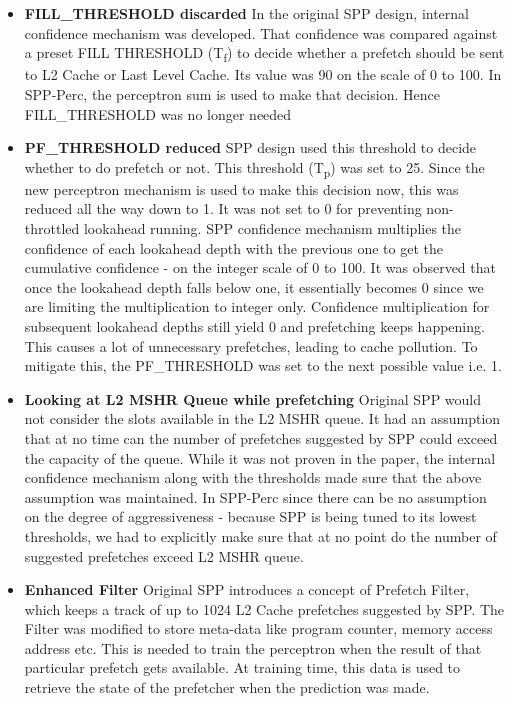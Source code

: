 \documentclass{sig-alternate}
\begin{document}
\begin{itemize}
\item \textbf{FILL\_THRESHOLD  discarded}\newline
In the original SPP design, internal confidence mechanism was developed. That confidence was compared against a preset FILL \textunderscore THRESHOLD (T\textsubscript{f}) to decide whether a prefetch should be sent to L2 Cache or Last Level Cache. Its value was 90 on the scale of 0 to 100. In SPP-Perc, the perceptron sum is used to make that decision. Hence FILL\_THRESHOLD was no longer needed

\item \textbf{PF\_THRESHOLD reduced}\newline
SPP design used this threshold to decide whether to do prefetch or not. This threshold (T\textsubscript{p}) was set to 25. Since the new perceptron mechanism is used to make this decision now, this was reduced all the way down to 1. It was not set to 0 for preventing non-throttled lookahead running. SPP confidence mechanism multiplies the confidence of each lookahead depth with the previous one to get the cumulative confidence - on the integer scale of 0 to 100. It was observed that once the lookahead depth falls below one, it essentially becomes 0 since we are limiting the multiplication to integer only. Confidence multiplication for subsequent lookahead depths still yield 0 and prefetching keeps happening. This causes a lot of unnecessary prefetches, leading to cache pollution. To mitigate this, the PF\_THRESHOLD was set to the next possible value i.e. 1. 


\item \textbf{Looking at L2 MSHR Queue while prefetching}\newline
Original SPP would not consider the slots available in the L2 MSHR queue. It had an assumption that at no time can the number of prefetches suggested by SPP could exceed the capacity of the queue. While it was not proven in the paper, the internal confidence mechanism along with the thresholds made sure that the above assumption was maintained. In SPP-Perc since there can be no assumption on the degree of aggressiveness - because SPP is being tuned to its lowest thresholds, we had to explicitly make sure that at no point do the number of suggested prefetches exceed L2 MSHR queue.

\item \textbf{Enhanced Filter}\newline
Original SPP introduces a concept of Prefetch Filter, which keeps a track of up to 1024 L2 Cache prefetches suggested by SPP. The Filter was modified to store meta-data like program counter, memory access address etc. This is needed to train the perceptron when the result of that particular prefetch gets available. At training time, this data is used to retrieve the state of the prefetcher when the prediction was made.


\end{itemize}
\end{document}
